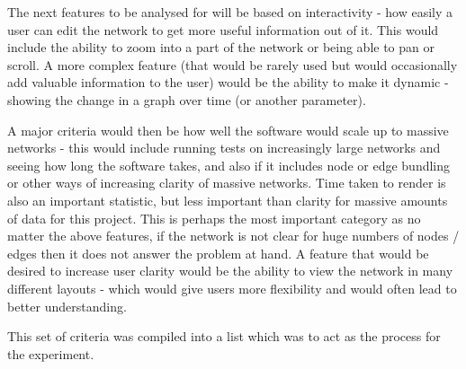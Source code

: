 \documentclass[../dissertation.tex]{subfiles}
\begin{document}
The next features to be analysed for will be based on interactivity - how easily a user can edit the network to get more useful information out of it. This would include the ability to zoom into a part of the network or being able to pan or scroll. A more complex feature (that would be rarely used but would occasionally add valuable information to the user) would be the ability to make it dynamic - showing the change in a graph over time (or another parameter). 

A major criteria would then be how well the software would scale up to massive networks - this would include running tests on increasingly large networks and seeing how long the software takes, and also if it includes node or edge bundling or other ways of increasing clarity of massive networks. Time taken to render is also an important statistic, but less important than clarity for massive amounts of data for this project. This is perhaps the most important category as no matter the above features, if the network is not clear for huge numbers of nodes / edges then it does not answer the problem at hand. A feature that would be desired to increase user clarity would be the ability to view the network in many different layouts - which would give users more flexibility and would often lead to better understanding. 

This set of criteria was compiled into a list which was to act as the process for the experiment. 
\end{document}
